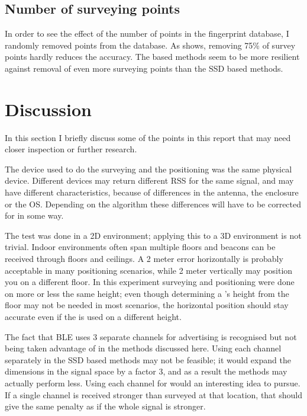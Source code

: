 \subsection{Number of surveying points}
In order to see the effect of the number of points in the fingerprint database, I randomly removed points from the database.
As  shows, removing 75\% of survey points hardly reduces the accuracy.
The \aBRP based methods seem to be more resilient against removal of even more surveying points than the SSD based methods.


\section{Discussion}
In this section I briefly discuss some of the points in this report that may need closer inspection or further research.

The device used to do the surveying and the positioning was the same physical device.
Different devices may return different RSS for the same signal, and may have different characteristics, because of differences in the antenna, the enclosure or the OS.
Depending on the algorithm these differences will have to be corrected for in some way.

The test was done in a 2D environment; applying this to a 3D environment is not trivial.
Indoor environments often span multiple floors and beacons can be received through floors and ceilings.
A 2 meter error horizontally is probably acceptable in many positioning scenarios, while 2 meter vertically may position you on a different floor.
In this experiment surveying and positioning were done on more or less the same height; even though determining a \device's height from the floor may not be needed in most scenarios, the horizontal position should stay accurate even if the \device is used on a different height.

The fact that BLE uses 3 separate channels for advertising is recognised but not being taken advantage of in the methods discussed here.
Using each channel separately in the SSD based methods may not be feasible; it would expand the dimensions in the signal space by a factor 3, and as a result the methods may actually perform less.
Using each channel for \aBRP would an interesting idea to pursue.
If a single channel is received stronger than surveyed at that location, that should give the same penalty as if the whole signal is stronger.

